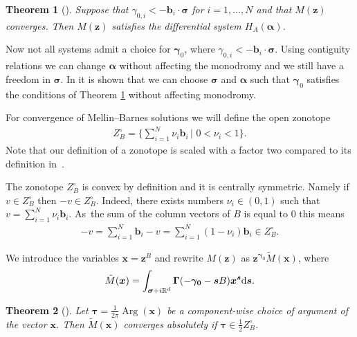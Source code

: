 \documentclass[pdftex]{sigma}
\DeclareMathOperator*{\Arg}{Arg}
\numberwithin{equation}{section}
\newtheorem{Theorem}{Theorem}[section]
\begin{document}
\begin{Theorem}[{\cite[Theorem 3.1]{Beu13}}]\label{thm-MB-gamma}%
Suppose that $\gamma_{0,i} < - \bm{b}_i \cdot \bm{\sigma}$ for
$i = 1,\dots,N$ and that $M(\bm{z})$ converges. Then $M(\bm{z})$ satisfies the differential system $H_{A}(\bm{\alpha})$.
\end{Theorem}
Now not all systems admit a choice for $\bm{\gamma}_0$, where $\gamma_{0,i} < - \bm{b}_i \cdot \bm{\sigma}$. Using contiguity relations we can change $\bm{\alpha}$ without affecting the monodromy and we still have a freedom in $\bm{\sigma}$.
In \cite{Beu13} it is shown that we can choose $\bm{\sigma}$ and $\bm{\alpha}$ such that $\bm{\gamma}_0$ satisfies the conditions of Theorem \ref{thm-MB-gamma} without affecting monodromy.

For convergence of Mellin--Barnes solutions we will define the open zonotope
\begin{gather*}
Z_B^{\circ} = \Bigg\{\sum_{i=1}^N \nu_i \bm{b}_i\,\bigg|\,\, 0 < \nu_i < 1\bigg\}.
\end{gather*}
Note that our definition of a zonotope is scaled with a factor two compared to its definition in~{\rm \cite{Beu13}}.

\begin{Remark}
\label{rem-zonotope-sym}
The zonotope $Z_B^{\circ}$ is convex by definition and it is centrally symmetric. Namely if $v \in Z_B^{\circ}$ then $-v \in Z_B^{\circ}$. Indeed, there exists numbers $\nu_i \in (0,1)$ such that $v = \sum_{i=1}^N \nu_i\bm{b}_i$. As~the sum of the column vectors of $B$ is equal to $0$ this means \begin{gather*}
-v = \sum_{i=1}^{N} \bm{b}_i - v = \sum_{i=1}^N (1 - \nu_i)\bm{b}_i \in Z_B^{\circ}.
\end{gather*}
\end{Remark}
We introduce the variables $\bm{x}=\bm{z}^B$ and rewrite $M(\bm{z})$ as
$\bm{z}^{\bm\gamma_0}\tilde{M}(\bm{x})$, where
\begin{gather*}
\tilde{M}(\bm{x})=\int_{\bm{\sigma} + i\mathbb{R}^d} \bm{\Gamma}(-\bm{\gamma_0}-\bm{s}B)
\bm{x}^{\bm{s}} {\rm d} \bm{s}.
\end{gather*}
\begin{Theorem}[{\cite[Corollary 4.2]{Beu13}}] %
Let $\bm{\tau} = \frac{1}{2\pi}\Arg(\bm{x})$ be a component-wise choice of argument of the vector $\bm{x}$. Then $\tilde{M}(\bm{x})$ converges absolutely if
$\bm{\tau} \in \frac{1}{2}Z_B^{\circ}$.
\end{Theorem}
\end{document}
